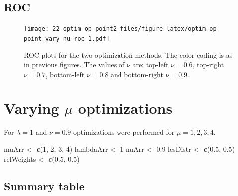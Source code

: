 \documentclass[
]{book}
\newenvironment{Shaded}{\begin{snugshade}}{\end{snugshade}}
\newcommand{\DecValTok}[1]{\textcolor[rgb]{0.00,0.00,0.81}{#1}}
\newcommand{\FloatTok}[1]{\textcolor[rgb]{0.00,0.00,0.81}{#1}}
\newcommand{\KeywordTok}[1]{\textcolor[rgb]{0.13,0.29,0.53}{\textbf{#1}}}
\newcommand{\NormalTok}[1]{#1}
\newcommand{\StringTok}[1]{\textcolor[rgb]{0.31,0.60,0.02}{#1}}
\begin{document}
\hypertarget{roc-3}{%
\subsection{ROC}\label{roc-3}}

\begin{figure}
\centering
\texttt{[image: 22-optim-op-point2\_files/figure-latex/optim-op-point-vary-nu-roc-1.pdf]}
\caption{\label{fig:optim-op-point-vary-nu-roc}ROC plots for the two optimization methods. The color coding is as in previous figures. The values of \(\nu\) are: top-left \(\nu = 0.6\), top-right \(\nu = 0.7\), bottom-left \(\nu = 0.8\) and bottom-right \(\nu = 0.9\).}
\end{figure}

\hypertarget{optim-op-point-vary-mu}{%
\section{\texorpdfstring{Varying \(\mu\) optimizations}{Varying \textbackslash mu optimizations}}\label{optim-op-point-vary-mu}}

For \(\lambda = 1\) and \(\nu = 0.9\) optimizations were performed for \(\mu = 1, 2, 3, 4\).

\begin{Shaded}
\begin{Highlighting}[]
\NormalTok{muArr <-}\StringTok{ }\KeywordTok{c}\NormalTok{(}\DecValTok{1}\NormalTok{, }\DecValTok{2}\NormalTok{, }\DecValTok{3}\NormalTok{, }\DecValTok{4}\NormalTok{)}
\NormalTok{lambdaArr <-}\StringTok{ }\DecValTok{1}
\NormalTok{nuArr <-}\StringTok{ }\FloatTok{0.9}
\NormalTok{lesDistr <-}\StringTok{ }\KeywordTok{c}\NormalTok{(}\FloatTok{0.5}\NormalTok{, }\FloatTok{0.5}\NormalTok{)}
\NormalTok{relWeights <-}\StringTok{ }\KeywordTok{c}\NormalTok{(}\FloatTok{0.5}\NormalTok{, }\FloatTok{0.5}\NormalTok{)}
\end{Highlighting}
\end{Shaded}

\hypertarget{summary-table-3}{%
\subsection{Summary table}\label{summary-table-3}}
\end{document}
